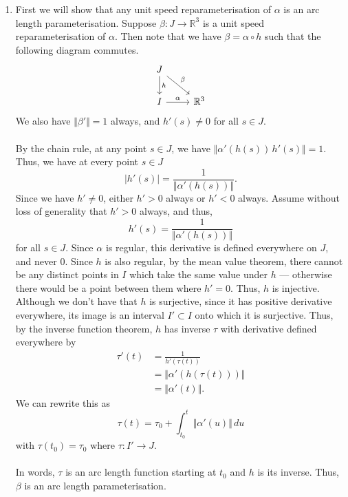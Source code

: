 \documentclass[12 pt, letterpaper]{hmcpset}
\begin{document}
\begin{solution}
	\begin{enumerate}
		\item First we will show that any unit speed reparameterisation of $\alpha$ is an arc length parameterisation. Suppose $\beta : J \to \mathbb{R}^{3}$ is a unit speed reparameterisation of $\alpha$. Then note that we have $\beta = \alpha \circ h$ such that the following diagram commutes.
			\[
				\begin{tikzcd}
					J \ar[rd, "\beta"] \ar[d, "h"] \\
					I \ar[r, "\alpha"] & \mathbb{R}^{3}
				\end{tikzcd}
			\]
			We also have $\Vert \beta' \Vert = 1$ always, and $h'(s) \neq 0$ for all $s \in J$.\\\\
			By the chain rule, at any point $s \in J$, we have $\Vert \alpha'(h(s)) \, h'(s) \Vert = 1$. Thus, we have at every point $s \in J$
			\[
				\vert h'(s) \vert = \frac{1}{\Vert \alpha'(h(s)) \Vert}.
			\]
			Since we have $h' \neq 0$, either $h' > 0$ always or $h' < 0$ always. Assume without loss of generality that $h' > 0$ always, and thus,
			\[
				h'(s) = \frac{1}{\Vert \alpha'(h(s)) \Vert}
			\]
			for all $s \in J$. Since $\alpha$ is regular, this derivative is defined everywhere on $J$, and never $0$. Since $h$ is also regular, by the mean value theorem, there cannot be any distinct points in $I$ which take the same value under $h$ --- otherwise there would be a point between them where $h' = 0$. Thus, $h$ is injective. Although we don't have that $h$ is surjective, since it has positive derivative everywhere, its image is an interval $I' \subset I$ onto which it is surjective. Thus, by the inverse function theorem, $h$ has inverse $\tau$ with derivative defined everywhere by
			\[
				\begin{split}
					\tau'(t) & = \frac{1}{h'(\tau(t))} \\
						 & = \Vert \alpha'(h(\tau(t))) \Vert \\
						 & = \Vert \alpha'(t) \Vert.
				\end{split}
			\]
			We can rewrite this as
			\[
				\tau(t) = \tau_{0} + \int_{t_{0}}^{t} \Vert \alpha'(u) \Vert \, du
			\]
			with $\tau(t_{0}) = \tau_{0}$ where $\tau : I' \to J$. \\\\
			In words, $\tau$ is an arc length function starting at $t_{0}$ and $h$ is its inverse. Thus, $\beta$ is an arc length parameterisation. \\\\

\end{enumerate}
\end{solution}
\end{document}
